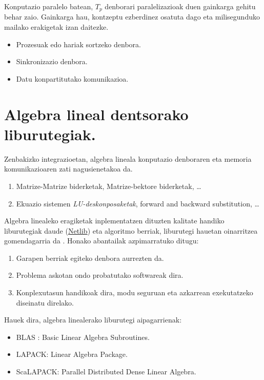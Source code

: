 Konputazio paralelo batean, $T_p$ denborari paralelizazioak duen gainkarga gehitu behar zaio. Gainkarga hau, kontzeptu ezberdinez osatuta dago eta milisegunduko mailako erakigetak izan daitezke.  
\begin{itemize}
\item Prozesuak edo hariak sortzeko denbora.
\item Sinkronizazio denbora.
\item Datu konpartitutako komunikazioa.
\end{itemize}

   
\section{Algebra lineal dentsorako liburutegiak.}


Zenbakizko integrazioetan, algebra lineala konputazio denboraren eta memoria komunikazioaren zati nagusienetakoa da. 
\begin{enumerate}
\item Matrize-Matrize biderketak, Matrize-bektore biderketak, \dots
\item Ekuazio sistemen \emph{LU-deskonposaketak}, forward and backward substitution, \dots
\end{enumerate}   

Algebra linealeko eragiketak inplementatzen dituzten kalitate handiko liburutegiak daude (\href{http://www.netlib.org}{Netlib}) eta algoritmo berriak, liburutegi hauetan oinarritzea gomendagarria da \cite{Hogben2013}. Honako abantailak azpimarratuko ditugu:
\begin{enumerate}
\item Garapen berriak egiteko denbora aurrezten da. 
\item Problema askotan ondo probatutako softwareak dira.
\item Konplexutasun handikoak dira, modu seguruan eta azkarrean exekutatzeko diseinatu direlako. 
\end{enumerate}

Hauek dira, algebra linealerako liburutegi aipagarrienak:
\begin{itemize}
\item BLAS : Basic Linear Algebra Subroutines.
\item LAPACK: Linear Algebra Package.
\item ScaLAPACK: Parallel Distributed Dense Linear Algebra.
\end{itemize}

